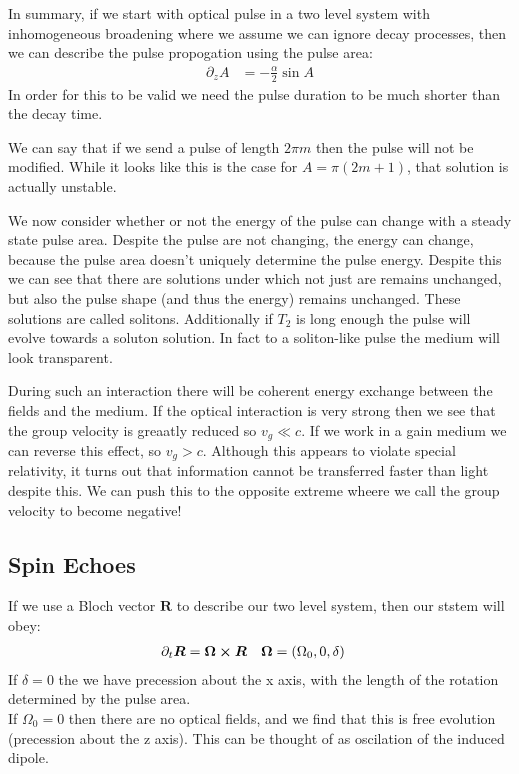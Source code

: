 In summary, if we start with optical pulse in a two level system with inhomogeneous broadening where we assume we can ignore decay processes, then we can describe the pulse propogation using the pulse area:
\begin{align*}
	\partial_z A &= -\frac{\alpha}{2}\sin A
\end{align*}
In order for this to be valid we need the pulse duration to be much shorter than the decay time.

We can say that if we send a pulse of length $2\pi m$ then the pulse will not be modified. While it looks like this is the case for $A = \pi(2m+1)$, that solution is actually unstable.

We now consider whether or not the energy of the pulse can change with a steady state pulse area. Despite the pulse are not changing, the energy can change, because the pulse area doesn't uniquely determine the pulse energy.
Despite this we can see that there are solutions under which not just are remains unchanged, but also the pulse shape (and thus the energy) remains unchanged. These solutions are called solitons.
Additionally if $T_2$ is long enough the pulse will evolve towards a soluton solution. In fact to a soliton-like pulse the medium will look transparent.

During such an interaction there will be coherent energy exchange between the fields and the medium. If the optical interaction is very strong then we see that the group velocity is greaatly reduced so $v_g \ll c$.
If we work in a gain medium we can reverse this effect, so $v_g > c$. Although this appears to violate special relativity, it turns out that information cannot be transferred faster than light despite this.
We can push this to the opposite extreme wheere we call the group velocity to become negative!
\subsection{Spin Echoes}
If we use a Bloch vector $\bm{R}$ to describe our two level system, then our ststem will obey:
\begin{align*}
	\partial_t \bm{R} &= \bm{\Omega}\cross\bm{R} &
	\bm{\Omega} &= (\Omega_0, 0 , \delta)
\end{align*}
If $\delta = 0$ the we have precession about the x axis, with the length of the rotation determined by the pulse area. \\
If $\Omega_0 = 0$ then there are no optical fields, and we find that this is free evolution (precession about the z axis). This can be thought of as oscilation of the induced dipole.

